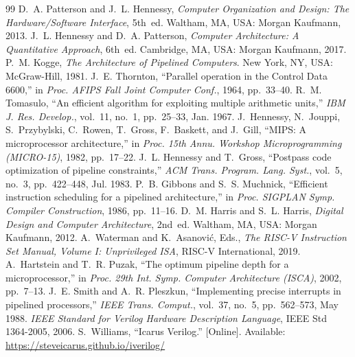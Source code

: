 \documentclass[conference]{IEEEtran}
\begin{document}

\begin{thebibliography}{99}
 D.~A. Patterson and J.~L. Hennessy, \emph{Computer Organization and Design: The Hardware/Software Interface}, 5th~ed. Waltham, MA, USA: Morgan Kaufmann, 2013.
 J.~L. Hennessy and D.~A. Patterson, \emph{Computer Architecture: A Quantitative Approach}, 6th~ed. Cambridge, MA, USA: Morgan Kaufmann, 2017.
 P.~M. Kogge, \emph{The Architecture of Pipelined Computers}. New York, NY, USA: McGraw-Hill, 1981.
 J.~E. Thornton, ``Parallel operation in the Control Data 6600,'' in \emph{Proc. AFIPS Fall Joint Computer Conf.}, 1964, pp.~33--40.
 R.~M. Tomasulo, ``An efficient algorithm for exploiting multiple arithmetic units,'' \emph{IBM J. Res. Develop.}, vol.~11, no.~1, pp.~25--33, Jan. 1967.
 J.~Hennessy, N.~Jouppi, S.~Przybylski, C.~Rowen, T.~Gross, F.~Baskett, and J.~Gill, ``MIPS: A microprocessor architecture,'' in \emph{Proc. 15th Annu. Workshop Microprogramming (MICRO-15)}, 1982, pp.~17--22.
 J.~L. Hennessy and T.~Gross, ``Postpass code optimization of pipeline constraints,'' \emph{ACM Trans. Program. Lang. Syst.}, vol.~5, no.~3, pp.~422--448, Jul. 1983.
 P.~B. Gibbons and S.~S. Muchnick, ``Efficient instruction scheduling for a pipelined architecture,'' in \emph{Proc. SIGPLAN Symp. Compiler Construction}, 1986, pp.~11--16.
 D.~M. Harris and S.~L. Harris, \emph{Digital Design and Computer Architecture}, 2nd~ed. Waltham, MA, USA: Morgan Kaufmann, 2012.
 A.~Waterman and K.~Asanovi\'{c}, Eds., \emph{The RISC-V Instruction Set Manual, Volume I: Unprivileged ISA}, RISC-V International, 2019.
 A.~Hartstein and T.~R. Puzak, ``The optimum pipeline depth for a microprocessor,'' in \emph{Proc. 29th Int. Symp. Computer Architecture (ISCA)}, 2002, pp.~7--13.
 J.~E. Smith and A.~R. Pleszkun, ``Implementing precise interrupts in pipelined processors,'' \emph{IEEE Trans. Comput.}, vol.~37, no.~5, pp.~562--573, May 1988.
 \emph{IEEE Standard for Verilog Hardware Description Language}, IEEE Std 1364-2005, 2006.
 S.~Williams, ``Icarus Verilog.'' [Online]. Available: \url{https://steveicarus.github.io/iverilog/}
\end{thebibliography}
\end{document}

